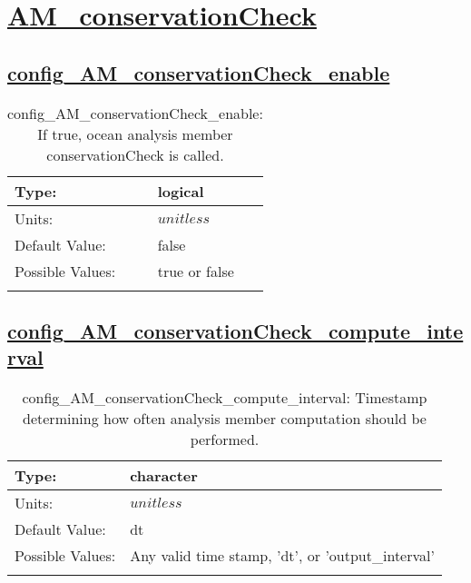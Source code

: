 \section[AM\_conservationCheck]{\hyperref[sec:nm_tab_AM_conservationCheck]{AM\_conservationCheck}}
\label{sec:nm_sec_AM_conservationCheck}
\subsection[config\_AM\_conservationCheck\_enable]{\hyperref[sec:nm_tab_AM_conservationCheck]{config\_AM\_conservationCheck\_enable}}
\label{subsec:nm_sec_config_AM_conservationCheck_enable}
\begin{center}
\begin{longtable}{| p{2.0in} || p{4.0in} |}
    \hline
    Type: & logical \\
    \hline
    Units: & $unitless$ \\
    \hline
    Default Value: & false \\
    \hline
    Possible Values: & true or false \\
    \hline
    \caption{config\_AM\_conservationCheck\_enable: If true, ocean analysis member conservationCheck is called.}
\end{longtable}
\end{center}
\subsection[config\_AM\_conservationCheck\_compute\_interval]{\hyperref[sec:nm_tab_AM_conservationCheck]{config\_AM\_conservationCheck\_compute\_interval}}
\label{subsec:nm_sec_config_AM_conservationCheck_compute_interval}
\begin{center}
\begin{longtable}{| p{2.0in} || p{4.0in} |}
    \hline
    Type: & character \\
    \hline
    Units: & $unitless$ \\
    \hline
    Default Value: & dt \\
    \hline
    Possible Values: & Any valid time stamp, 'dt', or 'output\_interval' \\
    \hline
    \caption{config\_AM\_conservationCheck\_compute\_interval: Timestamp determining how often analysis member computation should be performed.}
\end{longtable}
\end{center}
